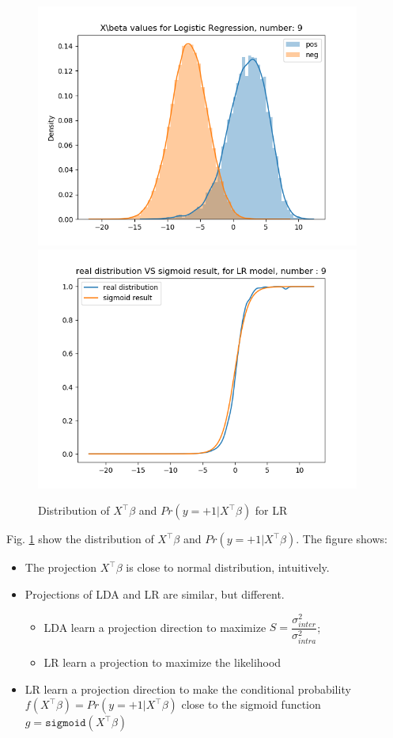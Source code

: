 \documentclass{article}
\begin{document}
\begin{figure}[H]
\begin{minipage}{0.19\textwidth}
        \includegraphics[width=0.95\textwidth]{fig/lr/9.png}
        \includegraphics[width=0.95\textwidth]{fig/lr/9-2.png}
    \end{minipage}
    \caption{Distribution of $X^\top\beta$ and $Pr(y=+1|X^\top\beta)$ for LR}
    \label{lrdist}
\end{figure}
Fig. \ref{lrdist} show the distribution of $X^\top\beta$ and $Pr(y=+1|X^\top\beta)$. The figure shows: 
\begin{itemize}
    \item The projection $X^\top\beta$ is close to normal distribution, intuitively.
    \item Projections of LDA and LR are similar, but different.
    \begin{itemize}
        \item LDA learn a projection direction to maximize $S = \dfrac{\sigma^2_{inter}}{\sigma^2_{intra}}$;
        \item LR learn a projection to maximize the likelihood
    \end{itemize} 
    \item LR learn a projection direction to make the conditional probability $f(X^\top\beta)=Pr(y=+1|X^\top\beta)$ close to the sigmoid function $g=\mathtt{sigmoid}(X^\top\beta)$ 
\end{itemize}
\end{document}

